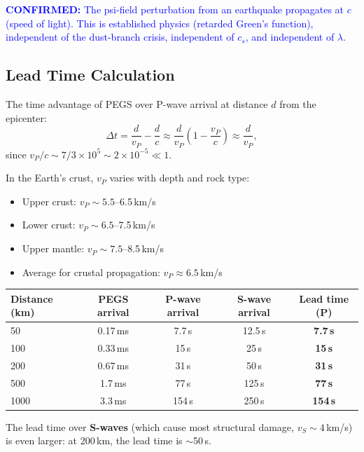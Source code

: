 \documentclass[11pt]{article}
\theoremstyle{definition}
\theoremstyle{remark}
\newcommand{\ee}[1]{\times10^{#1}}
\newcommand{\confirmed}[1]{\textcolor{blue}{\textbf{CONFIRMED:} #1}}
\begin{document}
\confirmed{The psi-field perturbation from an earthquake propagates at
$c$ (speed of light). This is established physics (retarded Green's function),
independent of the dust-branch crisis, independent of $c_s$, and independent
of $\lambda$.}

\subsection{Lead Time Calculation}

The time advantage of PEGS over P-wave arrival at distance $d$ from the
epicenter:
\begin{equation}\label{eq:lead-time}
  \Delta t = \frac{d}{v_P} - \frac{d}{c}
  \approx \frac{d}{v_P}\left(1 - \frac{v_P}{c}\right)
  \approx \frac{d}{v_P},
\end{equation}
since $v_P/c \sim 7/3\ee{5} \sim 2\ee{-5} \ll 1$.

In the Earth's crust, $v_P$ varies with depth and rock type:
\begin{itemize}
  \item Upper crust: $v_P \sim 5.5$--6.5\,km/s
  \item Lower crust: $v_P \sim 6.5$--7.5\,km/s
  \item Upper mantle: $v_P \sim 7.5$--8.5\,km/s
  \item Average for crustal propagation: $v_P \approx 6.5$\,km/s
\end{itemize}

\begin{center}
\begin{tabular}{lcccc}
\toprule
\textbf{Distance (km)} & \textbf{PEGS arrival} & \textbf{P-wave arrival}
  & \textbf{S-wave arrival} & \textbf{Lead time (P)} \\
\midrule
50 & 0.17\,ms & 7.7\,s & 12.5\,s & \textbf{7.7\,s} \\
100 & 0.33\,ms & 15\,s & 25\,s & \textbf{15\,s} \\
200 & 0.67\,ms & 31\,s & 50\,s & \textbf{31\,s} \\
500 & 1.7\,ms & 77\,s & 125\,s & \textbf{77\,s} \\
1000 & 3.3\,ms & 154\,s & 250\,s & \textbf{154\,s} \\
\bottomrule
\end{tabular}
\end{center}

The lead time over \textbf{S-waves} (which cause most structural damage,
$v_S \sim 4$\,km/s) is even larger: at 200\,km, the lead time is
$\sim$50\,s.
\end{document}
